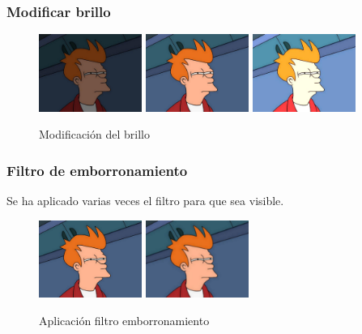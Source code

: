 \subsubsection{Modificar brillo}
\vskip0.3cm
\begin{figure}[H]
 \centering
  \includegraphics[width=0.3\textwidth]{imagenes/fryBrilo2.jpg}
  \includegraphics[width=0.3\textwidth]{imagenes/Fry.jpg}
  \includegraphics[width=0.3\textwidth]{imagenes/fryBrillo1.jpg}
 \caption{Modificación del brillo}
 \label{diseño}
\end{figure}
\subsubsection{Filtro de emborronamiento}
Se ha aplicado varias veces el filtro para que sea visible.
\vskip0.3cm
\begin{figure}[H]
 \centering
  \includegraphics[width=0.3\textwidth]{imagenes/Fry.jpg}
  \includegraphics[width=0.3\textwidth]{imagenes/fryEmborronamiento.jpg}
 \caption{Aplicación filtro emborronamiento}
 \label{diseño}
\end{figure}
